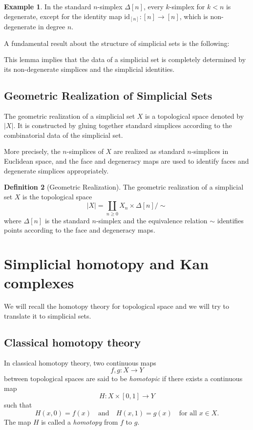 \documentclass[11pt]{article}
\theoremstyle{definition}
\newtheorem{definition}{Definition}[section]
\newtheorem{example}[definition]{Example}
\theoremstyle{plain}
\begin{document}
\begin{example}
    In the standard $n$-simplex $\Delta[n]$, every $k$-simplex for $k < n$ is degenerate, except for the identity map $\mathrm{id}_{[n]} : [n] \to [n]$, which is non-degenerate in degree $n$.
\end{example}

A fundamental result about the structure of simplicial sets is the following:



This lemma implies that the data of a simplicial set is completely determined by its non-degenerate simplices and the simplicial identities.


\subsection{Geometric Realization of Simplicial Sets}
The geometric realization of a simplicial set $X$ is a topological space denoted by $|X|$. It is constructed by gluing together standard simplices according to the combinatorial data of the simplicial set.

More precisely, the $n$-simplices of $X$ are realized as standard $n$-simplices in Euclidean space, and the face and degeneracy maps are used to identify faces and degenerate simplices appropriately.

\begin{definition}[Geometric Realization]
    The geometric realization of a simplicial set $X$ is the topological space
    \[
        |X| = \coprod_{n \geq 0} X_n \times \Delta[n] / \sim
    \]
    where $\Delta[n]$ is the standard $n$-simplex and the equivalence relation $\sim$ identifies points according to the face and degeneracy maps.
\end{definition}





\section{Simplicial homotopy and Kan complexes}
We will recall the homotopy theory for topological space and we will try to translate it to simplicial sets.

\subsection{Classical homotopy theory}
In classical homotopy theory, two continuous maps
\[
    f,g : X \to Y
\]
between topological spaces are said to be \emph{homotopic} if there exists a continuous map
\[
    H : X \times [0,1] \to Y
\]
such that
\[
    H(x,0) = f(x) \quad \text{and} \quad H(x,1) = g(x) \quad \text{for all } x \in X.
\]
The map $H$ is called a \emph{homotopy} from $f$ to $g$.
\end{document}

